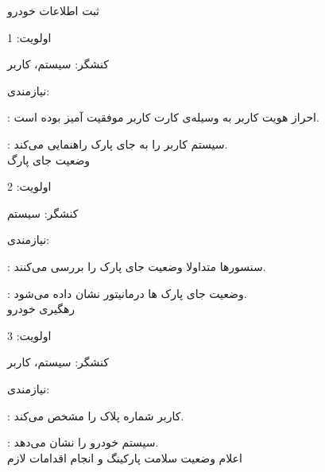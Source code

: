 \documentclass[oneside,a4paper,12pt]{book}
\begin{document}
\lr{\textbf{-}} \hspace{5 mm}  ثبت اطلاعات خودرو

\hspace{8 mm}	اولویت: 1

\hspace{8 mm}	کنشگر: سیستم، کاربر

\hspace{8 mm}	نیازمندی: 

\hspace{16 mm}	: احراز هویت کاربر به وسیله‌ی کارت کاربر موفقیت آمیز بوده است.

\hspace{16 mm}	: سیستم کاربر را به جای پارک راهنمایی می‌کند.\\


\lr{\textbf{-}} \hspace{5 mm}  وضعیت جای پارگ

\hspace{8 mm}	اولویت: 2

\hspace{8 mm}	کنشگر: سیستم

\hspace{8 mm}	نیازمندی: 

\hspace{16 mm}	: سنسورها متداولا وضعیت جای پارک را بررسی می‌کنند.

\hspace{16 mm}	: وضعیت جای پارک ها درمانیتور نشان داده می‌شود.\\


\lr{\textbf{-}} \hspace{5 mm}  رهگیری خودرو

\hspace{8 mm}	اولویت: 3

\hspace{8 mm}	کنشگر: سیستم، کاربر

\hspace{8 mm}	نیازمندی: 

\hspace{16 mm}	: کاربر شماره پلاک را مشخص می‌کند.

\hspace{16 mm}	: سیستم خودرو را نشان می‌دهد.\\


\lr{\textbf{-}} \hspace{5 mm}  اعلام وضعیت سلامت پارکینگ و انجام اقدامات لازم
\end{document}
